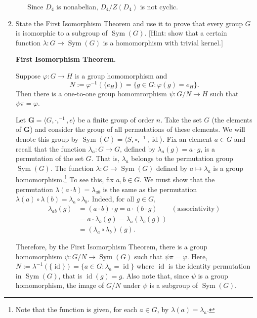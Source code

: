 \documentclass[fleqn,12pt]{article}
\newcommand{\<}{\ensuremath{\langle}}
\renewcommand{\>}{\ensuremath{\rangle}}
\newcommand{\Sym}{\ensuremath{\operatorname{Sym}}}
\newcommand{\id}{\ensuremath{\operatorname{id}}}
\newcommand{\bG}{\ensuremath{\mathbf{G}}}
\begin{document}
\begin{enumerate}[{\bf 1.}]
\begin{enumerate}
\medskip

Since $D_4$ is nonabelian, $D_4/Z(D_4)$ is not cyclic.
\end{enumerate}
\newpage
\item State the First Isomorphism Theorem and use it to prove that every group
  $G$ is isomorphic to a subgroup of $\Sym(G)$. [Hint: show that a certain
  function $\lambda : G \rightarrow \Sym(G)$ is a homomorphism with trivial
  kernel.]

\medskip

  {\bf First Isomorphism Theorem.}

  Suppose $\varphi: G \rightarrow H$ is a group homomorphism
  and 
  \[
  N := \varphi^{-1}(\{e_H\}) = \{g\in G: \varphi(g) = e_H\}.
  \]
  Then there is a one-to-one
  group homomrorphism $\psi : G/N \rightarrow H$ such that 
  $\psi \pi = \varphi$. 


Let $\bG = \<G, \cdot, ^{-1}, e\>$ be a finite group of order $n$.  
Take the set $G$ (the elements of $\bG$) and consider the group of all
permutations of these elements.  We will denote this group by
$\Sym(G) = \<S, \circ, ^{-1}, \id\>$.
Fix an element $a\in G$ and recall that the function
$\lambda_a: G \rightarrow G$, defined by $\lambda_a(g) = a\cdot g$, is a
permutation of the set $G$.  That is, $\lambda_a$ belongs to the
permutation group $\Sym(G)$.  
The function $\lambda: G \rightarrow \Sym(G)$ defined by 
$a\mapsto \lambda_a$ is a group homomorphism.\footnote{Note that the function
is given, for each $a\in G$, by $\lambda(a) = \lambda_a$.}
To see this, fix $a, b \in G$.  We must show that
the permutation 
$\lambda(a\cdot b) = \lambda_{ab}$
is the same as the permutation 
$\lambda(a) \circ \lambda(b) = \lambda_a \circ \lambda_b$.
Indeed, for all $g \in G$,
\begin{align*}
\lambda_{ab} (g) &= (a\cdot b) \cdot g = a \cdot (b \cdot g) \qquad (\text{associativity})\\
&= a \cdot \lambda_b(g) = \lambda_a (\lambda_b(g)) \\
& = (\lambda_a \circ \lambda_b)(g).
\end{align*}

Therefore, by the First Isomorphism Theorem, there is a group homomorphism 
$\psi : G/N \rightarrow \Sym(G)$ such that $\psi \pi = \varphi$. Here,
$N := \lambda^{-1}(\{\id\}) = \{a\in G: \lambda_a = \id\}$ where
$\id$ is the identity permutation in $\Sym(G)$, that is $\id(g) =g$.  Also note
that, since $\psi$ is a group homomorphism, the image of $G/N$ under $\psi$ is a
subgroup of $\Sym(G)$.


\end{enumerate}
\end{document}
